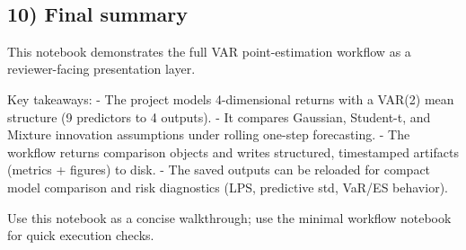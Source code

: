 \documentclass[11pt]{article}
\begin{document}
    \begin{center}
    \end{center}
    { \hspace*{\fill} \\}
    
    \begin{center}
    \end{center}
    { \hspace*{\fill} \\}
    
    \begin{center}
    \end{center}
    { \hspace*{\fill} \\}
    
    \begin{center}
    \end{center}
    { \hspace*{\fill} \\}
    
    \begin{center}
    \end{center}
    { \hspace*{\fill} \\}
    
    \begin{center}
    \end{center}
    { \hspace*{\fill} \\}
    
    \subsection{10) Final summary}\label{final-summary}

This notebook demonstrates the full VAR point-estimation workflow as a
reviewer-facing presentation layer.

Key takeaways: - The project models 4-dimensional returns with a VAR(2)
mean structure (9 predictors to 4 outputs). - It compares Gaussian,
Student-t, and Mixture innovation assumptions under rolling one-step
forecasting. - The workflow returns comparison objects and writes
structured, timestamped artifacts (metrics + figures) to disk. - The
saved outputs can be reloaded for compact model comparison and risk
diagnostics (LPS, predictive std, VaR/ES behavior).

Use this notebook as a concise walkthrough; use the minimal workflow
notebook for quick execution checks.


    
    
    
\end{document}
